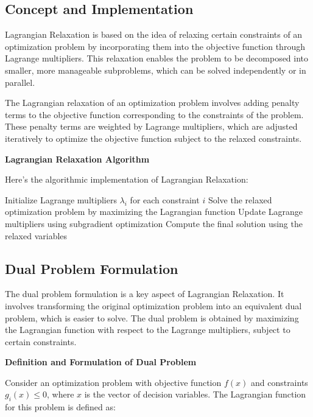 \documentclass[12pt]{book} %
\begin{document}
\subsection{Concept and Implementation}

Lagrangian Relaxation is based on the idea of relaxing certain constraints of an optimization problem by incorporating them into the objective function through Lagrange multipliers. This relaxation enables the problem to be decomposed into smaller, more manageable subproblems, which can be solved independently or in parallel.

The Lagrangian relaxation of an optimization problem involves adding penalty terms to the objective function corresponding to the constraints of the problem. These penalty terms are weighted by Lagrange multipliers, which are adjusted iteratively to optimize the objective function subject to the relaxed constraints.

\textbf{Lagrangian Relaxation Algorithm}

Here's the algorithmic implementation of Lagrangian Relaxation:
\FloatBarrier
\begin{algorithm}[H]
\caption{Lagrangian Relaxation}
\begin{algorithmic}[1]
\State Initialize Lagrange multipliers $\lambda_i$ for each constraint $i$
    \State Solve the relaxed optimization problem by maximizing the Lagrangian function
    \State Update Lagrange multipliers using subgradient optimization
\EndWhile
\State Compute the final solution using the relaxed variables
\end{algorithmic}
\end{algorithm}
\FloatBarrier

\subsection{Dual Problem Formulation}

The dual problem formulation is a key aspect of Lagrangian Relaxation. It involves transforming the original optimization problem into an equivalent dual problem, which is easier to solve. The dual problem is obtained by maximizing the Lagrangian function with respect to the Lagrange multipliers, subject to certain constraints.

\textbf{Definition and Formulation of Dual Problem}

Consider an optimization problem with objective function $f(x)$ and constraints $g_i(x) \leq 0$, where $x$ is the vector of decision variables. The Lagrangian function for this problem is defined as:
\end{document}
